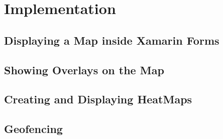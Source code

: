 \section{Implementation}

\subsection{Displaying a Map inside Xamarin Forms}

\subsection{Showing Overlays on the Map}

\subsection{Creating and Displaying HeatMaps}

\subsection{Geofencing}

